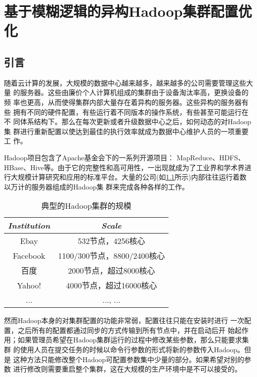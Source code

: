 \chapter{基于模糊逻辑的异构Hadoop集群配置优化}
\label{chapter:hadoop}

\section{引言}

随着云计算的发展，大规模的数据中心越来越多，越来越多的公司需要管理这些大量
的服务器。这些由廉价个人计算机组成的集群由于设备淘汰率高，更换设备的频
率也更高，从而使得集群内部大量存在着异构的服务器。这些异构的服务器有些
拥有不同的硬件配置，有些运行着不同版本的操作系统，有些甚至可能运行在不
同体系结构下。那么在每次更新或者升级数据中心之后，如何动态的对Hadoop集
群进行重新配置以使达到最佳的执行效率就成为数据中心维护人员的一项重要工
作。

Hadoop项目\cite{hadoopproject}包含了Apache基金会下的一系列开源项目：
MapReduce、HDFS、HBase\cite{hbaseproject}、Hive\cite{hiveproject}等。由于它的完整性和高可用性，一出现就成为了工业界和学术界进行大规模计算研究和应用的标准平台。大量的公司(如\ref{table:hadoopcluster}所示)内部往往运行着数以万计的服务器组成的Hadoop集
群来完成各种各样的工作。

\begin{table}[h!]\small
  \caption{典型的Hadoop集群的规模\cite{hadooppowerby}}
  \label{table:hadoopcluster}
  \centering
  \begin{tabular}{|c|c|}
    \hline
    \textit{Institution} & \textit{Scale} \\
    \hline
    Ebay & 532节点，4256核心\\
    \hline
    Facebook & 1100/300节点，8800/2400核心\\
    \hline
    百度 & 2000节点，超过8000核心\\
    \hline
    Yahoo! & 4000节点，超过16000核心\\
    \hline
    ... &  ..., ...\\
    \hline
  \end{tabular}
\end{table}

然而Hadoop本身的对集群配置的功能非常弱，配置往往只能在安装时进行
一次配置，之后所有的配置都通过同步的方式传输到所有节点中，并在启动后开
始起作用；如果管理员希望在Hadoop集群运行的过程中修改某些参数，那么只能要求集群
的使用人员在提交任务的时候以命令行参数的形式将新的参数传入Hadoop。但是
这种方法只能修改整个Hadoop可配置参数集中少量的部分。如果希望对别的参数
进行修改则需要重启整个集群，这在大规模的生产环境中是不可以接受的。

